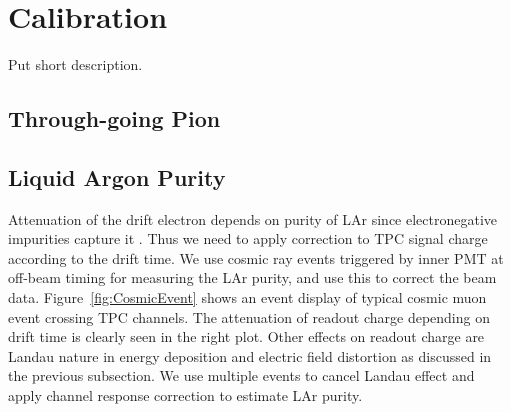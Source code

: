 \section{Calibration}
Put short description.
\subsection{Through-going Pion}

\subsection{Liquid Argon Purity}

Attenuation of the drift electron depends on purity of LAr since electronegative impurities capture it \cite{purity}. 
Thus we need to apply correction to TPC signal charge according to the drift time.
We use cosmic ray events triggered by inner PMT at off-beam timing for measuring the LAr purity, and use this to correct the beam data.
Figure~\ref{fig:CosmicEvent} shows an event display of typical cosmic muon event crossing TPC channels.
The attenuation of readout charge depending on drift time is clearly seen in the right plot. 
Other effects on readout charge are Landau nature in energy deposition and electric field distortion as discussed in the previous subsection.
We use multiple events to cancel Landau effect and apply channel response correction to estimate LAr purity.


